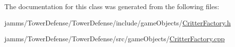 The documentation for this class was generated from the following files\+:\begin{DoxyCompactItemize}
\item 
jamms/\+Tower\+Defense/\+Tower\+Defense/include/game\+Objects/\hyperlink{_critter_factory_8h}{Critter\+Factory.\+h}\item 
jamms/\+Tower\+Defense/\+Tower\+Defense/src/game\+Objects/\hyperlink{_critter_factory_8cpp}{Critter\+Factory.\+cpp}\end{DoxyCompactItemize}
